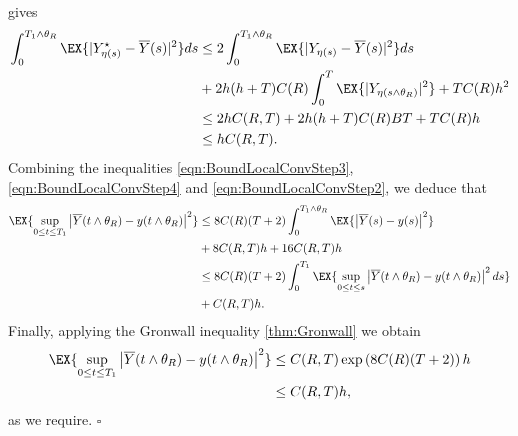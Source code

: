 \begin{pf}
	gives
	\begin{align}
		\int_{0}^{T_1\wedge \theta_R}
		\EX{|Y_{\eta(s)}^{\star} - \overline{Y}(s)|^2}ds
		&\leq
			2\int_{0}^{T_1\wedge \theta_R}
				\EX{|Y_{\eta(s)} - \overline{Y}(s)|^2}ds
			\notag\\
		&+
		2h(h+T)C(R)
			\int_0^T
				\EX{|Y_{\eta(s\wedge \theta_R)}|^2} 
		+
		TC(R)h^2
		\notag \\
		&\leq
		2hC(R,T) + 2h(h+T)C(R) B T  + TC(R)h
		\notag \\
		&\leq
		hC(R,T). \label{eqn:BoundLocalConvStep4}
	\end{align}
	Combining the inequalities \eqref{eqn:BoundLocalConvStep3}, \eqref{eqn:BoundLocalConvStep4} and 
	\eqref{eqn:BoundLocalConvStep2}, we deduce that
		\begin{align*}
		\EX{
			\sup_{0 \leq t \leq T_1}
			\left|
			\overline{Y}(t\wedge \theta_R)
			- y(t\wedge \theta_R)
			\right|^2
		}
		&\leq
		8C(R)(T+2)
		\int_{0}^{T_1\wedge \theta_R}
		\EX{
			\left|
			\overline{Y}(s)
			-y(s)
			\right|^2
		}\notag
		\\
		&+8C(R,T)h + 16C(R,T)h\notag
		\\
		&\leq
		8C(R)(T+2)\int_0^{T_1}
		\EX{
			\sup_{0 \leq t \leq s}
			\left|
			\overline{Y}(t\wedge \theta_R)
			- y(t\wedge \theta_R)
			\right|^2ds
		}\notag \\
		&+C(R,T)h.
		\end{align*}
		Finally, applying the Gronwall inequality \eqref{thm:Gronwall} we obtain
		\begin{align*}
		\EX{
			\sup_{0 \leq t \leq T_1}
			\left|
			\overline{Y}(t\wedge \theta_R)
			- y(t\wedge \theta_R)
			\right|^2
		}
		&\leq
		C(R,T)\exp\left(8C(R)(T+2)\right) h \notag
		\\
		&\leq
		C(R,T)h,
		\end{align*}
		as we require. $\square$
	\end{pf}

